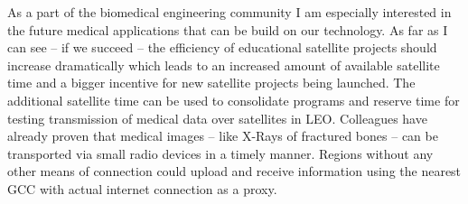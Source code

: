\documentclass[BachelorPaper]{subfiles}
\begin{document}
As a part of the biomedical engineering community I am especially interested in the future medical applications that can be build on our technology. As far as I can see -- if we succeed -- the efficiency of educational satellite projects should increase dramatically which leads to an increased amount of available satellite time and a bigger incentive for new satellite projects being launched. The additional satellite time can be used to consolidate programs and reserve time for testing transmission of medical data over satellites in \ac{LEO}. Colleagues have already proven that medical images -- like X-Rays of fractured bones -- can be transported via small radio devices in a timely manner. Regions without any other means of connection could upload and receive information using the nearest \ac{GCC} with actual internet connection as a proxy.\\
\end{document}
